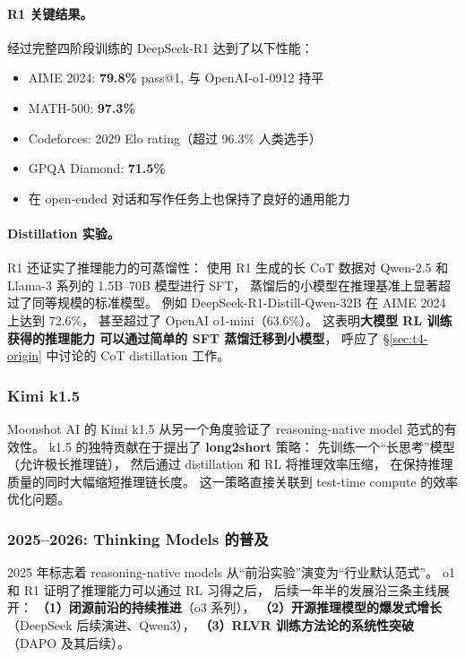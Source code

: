 \paragraph{R1 关键结果。}
经过完整四阶段训练的 DeepSeek-R1 达到了以下性能：
\begin{itemize}[leftmargin=2em]
  \item AIME 2024: \textbf{79.8\%} pass@1, 与 OpenAI-o1-0912 持平
  \item MATH-500: \textbf{97.3\%}
  \item Codeforces: 2029 Elo rating（超过 96.3\% 人类选手）
  \item GPQA Diamond: \textbf{71.5\%}
  \item 在 open-ended 对话和写作任务上也保持了良好的通用能力
\end{itemize}

\paragraph{Distillation 实验。}
R1 还证实了推理能力的可蒸馏性：
使用 R1 生成的长 CoT 数据对 Qwen-2.5 和 Llama-3 系列的 1.5B--70B 模型进行 SFT，
蒸馏后的小模型在推理基准上显著超过了同等规模的标准模型。
例如 DeepSeek-R1-Distill-Qwen-32B 在 AIME 2024 上达到 72.6\%，
甚至超过了 OpenAI o1-mini（63.6\%）。
这表明\textbf{大模型 RL 训练获得的推理能力
可以通过简单的 SFT 蒸馏迁移到小模型}，
呼应了 \S\ref{sec:t4-origin} 中讨论的 CoT distillation 工作。

\subsubsection{Kimi k1.5}

Moonshot AI 的 Kimi k1.5 \cite{moonshot2025kimi} 从另一个角度验证了
reasoning-native model 范式的有效性。
k1.5 的独特贡献在于提出了 \textbf{long2short} 策略：
先训练一个``长思考''模型（允许极长推理链），
然后通过 distillation 和 RL 将推理效率压缩，
在保持推理质量的同时大幅缩短推理链长度。
这一策略直接关联到 test-time compute 的效率优化问题。

\subsubsection{2025--2026: Thinking Models 的普及}
\label{sec:t4-thinking-models}

2025 年标志着 reasoning-native models 从``前沿实验''演变为``行业默认范式''。
o1 和 R1 证明了推理能力可以通过 RL 习得之后，
后续一年半的发展沿三条主线展开：
\textbf{（1）闭源前沿的持续推进}（o3 系列），
\textbf{（2）开源推理模型的爆发式增长}（DeepSeek 后续演进、Qwen3），
\textbf{（3）RLVR 训练方法论的系统性突破}（DAPO 及其后续）。

